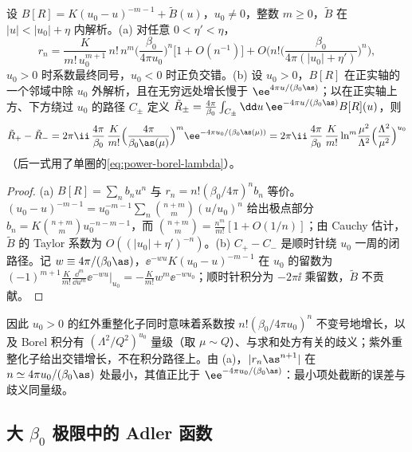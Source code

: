 \begin{lemma}\label{lem:power-borel-pole}
设 $B[R]=K(u_0-u)^{-m-1}+\tilde B(u)$，$u_0\ne0$，整数 $m\ge0$，$\tilde B$ 在 $|u|<|u_0|+\eta$ 内解析。(a) 对任意 $0<\eta'<\eta$，
\begin{equation*}
r_n=\frac{K}{m!\,u_0^{m+1}}\,n!\,n^m\Big(\frac{\beta_0}{4\pi u_0}\Big)^n\big[1+O(n^{-1})\big]+O\Big(n!\Big(\frac{\beta_0}{4\pi(|u_0|+\eta')}\Big)^n\Big),
\end{equation*}
$u_0>0$ 时系数最终同号，$u_0<0$ 时正负交错。(b) 设 $u_0>0$，$B[R]$ 在正实轴的一个邻域中除 $u_0$ 外解析，且在无穷远处增长慢于 $\ee^{4\pi u/(\beta_0\as)}$；以在正实轴上方、下方绕过 $u_0$ 的路径 $C_\pm$ 定义 $\tilde R_\pm=\frac{4\pi}{\beta_0}\int_{C_\pm}\dd u\,\ee^{-4\pi u/(\beta_0\as)}B[R](u)$，则
\begin{equation*}
\tilde R_+-\tilde R_-=2\pi\ii\,\frac{4\pi}{\beta_0}\,\frac{K}{m!}\Big(\frac{4\pi}{\beta_0\as(\mu)}\Big)^m\ee^{-4\pi u_0/(\beta_0\as(\mu))}
=2\pi\ii\,\frac{4\pi}{\beta_0}\,\frac{K}{m!}\ln^m\!\frac{\mu^2}{\Lambda^2}\Big(\frac{\Lambda^2}{\mu^2}\Big)^{u_0}
\end{equation*}
（后一式用了单圈的\eqref{eq:power-borel-lambda}）。
\end{lemma}

\begin{proof}
(a) $B[R]=\sum_nb_nu^n$ 与 $r_n=n!(\beta_0/4\pi)^nb_n$ 等价。$(u_0-u)^{-m-1}=u_0^{-m-1}\sum_n\binom{n+m}{m}(u/u_0)^n$ 给出极点部分 $b_n=K\binom{n+m}{m}u_0^{-n-m-1}$，而 $\binom{n+m}{m}=\frac{n^m}{m!}[1+O(1/n)]$；由 Cauchy 估计，$\tilde B$ 的 Taylor 系数为 $O((|u_0|+\eta')^{-n})$。(b) $C_+-C_-$ 是顺时针绕 $u_0$ 一周的闭路径。记 $w\equiv4\pi/(\beta_0\as)$，$\ee^{-wu}K(u_0-u)^{-m-1}$ 在 $u_0$ 的留数为 $(-1)^{m+1}\frac{K}{m!}\frac{\dd^m}{\dd u^m}\ee^{-wu}\big|_{u_0}=-\frac{K}{m!}w^m\ee^{-wu_0}$；顺时针积分为 $-2\pi\ii$ 乘留数，$\tilde B$ 不贡献。
\end{proof}

因此 $u_0>0$ 的红外重整化子同时意味着系数按 $n!(\beta_0/4\pi u_0)^n$ 不变号地增长，以及 Borel 积分有 $(\Lambda^2/Q^2)^{u_0}$ 量级（取 $\mu\sim Q$）、与求和处方有关的歧义；紫外重整化子给出交错增长，不在积分路径上。由 (a)，$|r_n\as^{n+1}|$ 在 $n\simeq4\pi u_0/(\beta_0\as)$ 处最小，其值正比于 $\ee^{-4\pi u_0/(\beta_0\as)}$：最小项处截断的误差与歧义同量级。

\subsection{大 \texorpdfstring{$\beta_0$}{beta0} 极限中的 Adler 函数}

